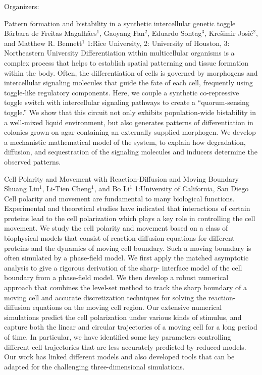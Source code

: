 \label{mini31}

\miniabs
{}
{Organizers: }
{}

\vspace{2ex}
\abs
{Pattern formation and bistability in a synthetic intercellular genetic toggle}
{B\'arbara de Freitas Magalh\~aes$^{1}$, Gaoyang Fan$^{2}$, Eduardo Sontag$^{3}$, Kre\v simir Josi\'c$^{2}$, and Matthew R. Bennett$^{1}$}
{1:Rice University, 2: University of Houston, 3: Northeastern University}
{Differentiation within multicellular organisms is a complex process that helps to establish spatial patterning and tissue formation within the body. Often, the differentiation of cells is governed by morphogens and intercellular signaling molecules that guide the fate of each cell, frequently using toggle-like regulatory components. Here, we couple a synthetic co-repressive toggle switch with intercellular signaling pathways to create a ``quorum-sensing toggle.'' We show that this circuit not only exhibits population-wide bistability in a well-mixed liquid environment, but also generates patterns of differentiation in colonies grown on agar containing an externally supplied morphogen. We develop a mechanistic mathematical model of the system, to explain how degradation, diffusion, and sequestration of the signaling molecules and inducers determine the observed patterns.}


\vspace{1.5ex}
\abs
{Cell Polarity and Movement with Reaction-Diffusion and Moving Boundary}
{Shuang Liu$^{1}$, Li-Tien Cheng$^{1}$, and Bo Li$^{1}$}
{1:University of California, San Diego}
{Cell polarity and movement are fundamental to many biological functions. Experimental and theoretical studies have indicated that interactions of certain proteins lead to the cell polarization which plays a key role in controlling the cell movement. We study the cell polarity and movement based on a class of biophysical models that consist of reaction-diffusion equations for different proteins and the dynamics of moving cell boundary. Such a moving boundary is often simulated by a phase-field model. We first apply the matched asymptotic analysis to give a rigorous derivation of the sharp- interface model of the cell boundary from a phase-field model. We then develop a robust numerical approach that combines the level-set method to track the sharp boundary of a moving cell and accurate discretization techniques for solving the reaction-diffusion equations on the moving cell region. Our extensive numerical simulations predict the cell polarization under various kinds of stimulus, and capture both the linear and circular trajectories of a moving cell for a long period of time. In particular, we have identified some key parameters controlling different cell trajectories that are less accurately predicted by reduced models. Our work has linked different models and also developed tools that can be adapted for the challenging three-dimensional simulations.}


